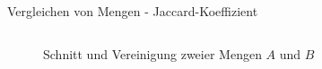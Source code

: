 \begin{frame}{Vergleichen von Mengen - Jaccard-Koeffizient}
\begin{columns}
\begin{column}{.40\textwidth}
\begin{figure}[H]
                \caption{Schnitt und Vereinigung zweier Mengen $ A $ und $ B $ \cite{intersectionImage,unionImage}}
            \end{figure}        
        \end{column}
    \end{columns}
\end{frame}


